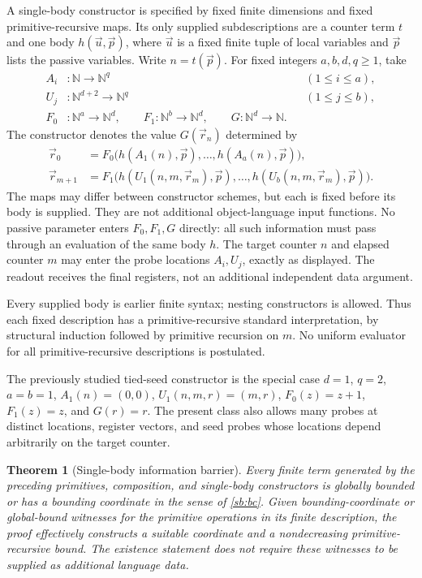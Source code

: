 \documentclass[11pt,letterpaper]{article}
\newtheorem{theorem}{Theorem}[section]
\theoremstyle{definition}\newtheorem{definition}[theorem]{Definition}
\theoremstyle{remark}\newtheorem{remark}[theorem]{Remark}
\begin{document}
A single-body constructor is specified by fixed finite dimensions and
fixed primitive-recursive maps.  Its only supplied subdescriptions are a
counter term $t$ and one body $h(\vec u,\vec p)$, where $\vec u$ is a
fixed finite tuple of local variables and $\vec p$ lists the passive
variables.  Write $n=t(\vec p)$.  For fixed integers $a,b,d,q\ge1$, take
\[
 \begin{aligned}
 A_i&:\mathbb N\longrightarrow\mathbb N^q &&(1\le i\le a),\\
 U_j&:\mathbb N^{d+2}\longrightarrow\mathbb N^q &&(1\le j\le b),\\
 F_0&:\mathbb N^a\longrightarrow\mathbb N^d,\qquad
 F_1:\mathbb N^b\longrightarrow\mathbb N^d,\qquad
 G:\mathbb N^d\longrightarrow\mathbb N.
 \end{aligned}
\]
The constructor denotes the value $G(\vec r_n)$ determined by
\begin{align}
 \vec r_0&=F_0\bigl(h(A_1(n),\vec p),\ldots,h(A_a(n),\vec p)\bigr),
 \label{sb:seed}\\
 \vec r_{m+1}&=F_1\bigl(
 h(U_1(n,m,\vec r_m),\vec p),\ldots,
 h(U_b(n,m,\vec r_m),\vec p)\bigr).
 \label{sb:step}
\end{align}
The maps may differ between constructor schemes, but each is fixed before
its body is supplied.  They are not additional object-language input
functions.  No passive parameter enters $F_0,F_1,G$ directly: all such
information must pass through an evaluation of the same body $h$.
The target counter $n$ and elapsed counter $m$ may enter the probe locations
$A_i,U_j$, exactly as displayed.  The readout receives the final registers,
not an additional independent data argument.

Every supplied body is earlier finite syntax; nesting constructors is
allowed.  Thus each fixed description has a primitive-recursive standard
interpretation, by structural induction followed by primitive recursion on
$m$.  No uniform evaluator for all primitive-recursive descriptions is
postulated.

The previously studied tied-seed constructor is the special case
$d=1$, $q=2$, $a=b=1$, $A_1(n)=(0,0)$,
$U_1(n,m,r)=(m,r)$, $F_0(z)=z+1$, $F_1(z)=z$, and $G(r)=r$.
The present class also allows many probes at distinct locations, register
vectors, and seed probes whose locations depend arbitrarily on the target
counter.

\begin{theorem}[Single-body information barrier]
\label{thm:single-body-barrier}
Every finite term generated by the preceding primitives, composition, and
single-body constructors is globally bounded or has a bounding coordinate
in the sense of \eqref{sb:bc}. Given bounding-coordinate or global-bound
witnesses for the primitive operations in its finite description, the
proof effectively constructs a suitable coordinate and a nondecreasing
primitive-recursive bound. The existence statement does not require these
witnesses to be supplied as additional language data.
\end{theorem}
\end{document}
